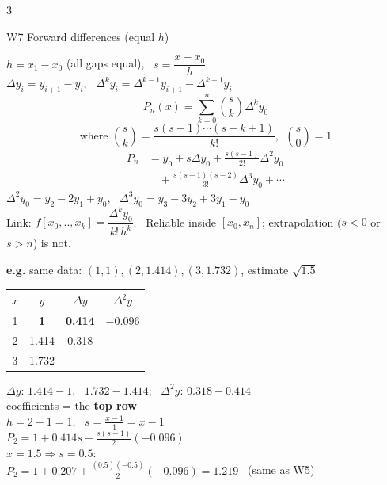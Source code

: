\documentclass[8pt,a4paper]{extarticle}
\newcommand{\hd}[1]{\par\vspace{3pt}\noindent\colorbox{accent}{\parbox{\dimexpr\linewidth-2\fboxsep}{\color{white}\bfseries\strut #1}}\par\vspace{1pt}}
\newenvironment{ex}[1]{\par\vspace{2pt}\noindent\begin{lrbox}{\exbox}\begin{minipage}{\dimexpr\linewidth-2\fboxsep}\RaggedRight\color{grn}\textbf{e.g.} #1\par\setlength{\parskip}{1.5pt}}{\end{minipage}\end{lrbox}\colorbox{exbg}{\usebox{\exbox}}\par\vspace{1pt}}
\begin{document}
\begin{multicols*}{3}
\hd{W7 Forward differences (equal $h$)}
$h=x_1-x_0$ (all gaps equal), \ $s=\dfrac{x-x_0}{h}$\\
$\Delta y_i=y_{i+1}-y_i$, \ $\Delta^ky_i=\Delta^{k-1}y_{i+1}-\Delta^{k-1}y_i$
\[P_n(x)=\sum_{k=0}^{n}\binom{s}{k}\Delta^ky_0\]\[\text{where }\binom sk=\frac{s(s-1)\cdots(s-k+1)}{k!},\ \ \binom s0=1\]
\begin{align*}P_n&=y_0+s\Delta y_0+\frac{s(s-1)}{2!}\Delta^2y_0\\&\quad+\frac{s(s-1)(s-2)}{3!}\Delta^3y_0+\cdots\end{align*}
$\Delta^2y_0=y_2-2y_1+y_0$, \ $\Delta^3y_0=y_3-3y_2+3y_1-y_0$\\
Link: $f[x_0,..,x_k]=\dfrac{\Delta^ky_0}{k!\,h^k}$. \ Reliable inside $[x_0,x_n]$; extrapolation ($s<0$ or $s>n$) is not.
\begin{ex}{same data: $(1,1),(2,1.414),(3,1.732)$, estimate $\sqrt{1.5}$}
{\centering\begin{tabular}{@{}c|c|c|c@{}}
$x$ & $y$ & $\Delta y$ & $\Delta^2y$\\\hline
1 & \textbf{1} & \textbf{0.414} & $\mathbf{-0.096}$\\
2 & 1.414 & 0.318 & \\
3 & 1.732 & &
\end{tabular}\par}
$\Delta y$: $1.414-1$, \ $1.732-1.414$; \ $\Delta^2y$: $0.318-0.414$\\
coefficients = the \textbf{top row}\\
$h=2-1=1$, \ $s=\frac{x-1}{1}=x-1$\\
$P_2=1+0.414s+\frac{s(s-1)}{2}(-0.096)$\\
$x=1.5\Rightarrow s=0.5$:\\
$P_2=1+0.207+\frac{(0.5)(-0.5)}{2}(-0.096)=1.219$ \ (same as W5)
\end{ex}

\end{multicols*}
\end{document}
